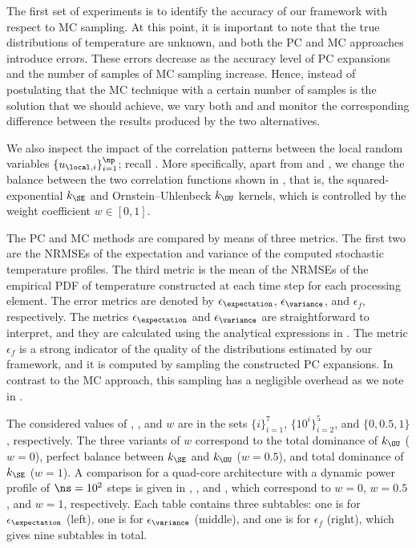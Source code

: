 
The first set of experiments is to identify the accuracy of our framework with
respect to \ac{MC} sampling. At this point, it is important to note that the
true distributions of temperature are unknown, and both the \ac{PC} and \ac{MC}
approaches introduce errors. These errors decrease as the accuracy level \lc of
\ac{PC} expansions and the number of samples \no of \ac{MC} sampling increase.
Hence, instead of postulating that the \ac{MC} technique with a certain number
of samples is the solution that we should achieve, we vary both \lc and \no and
monitor the corresponding difference between the results produced by the two
alternatives.

We also inspect the impact of the correlation patterns between the local random
variables $\{ u_{\local, i} \}_{i = 1}^\np$; recall .
More specifically, apart from \lc and \no, we change the balance between the two
correlation functions shown in , that is, the
squared-exponential $k_\SE$ and Ornstein--Uhlenbeck $k_\OU$ kernels, which is
controlled by the weight coefficient $w \in [0, 1]$.

The \ac{PC} and \ac{MC} methods are compared by means of three metrics. The
first two are the \acfp{NRMSE} of the expectation and variance of the computed
stochastic temperature profiles. The third metric is the mean of the \acp{NRMSE}
of the empirical \acf{PDF} of temperature constructed at each time step for each
processing element. The error metrics are denoted by $\epsilon_{\expectation}$,
$\epsilon_{\variance}$, and $\epsilon_f$, respectively. The metrics
$\epsilon_{\expectation}$ and $\epsilon_{\variance}$ are straightforward to
interpret, and they are calculated using the analytical expressions in
. The metric $\epsilon_f$ is a strong indicator of the
quality of the distributions estimated by our framework, and it is computed by
sampling the constructed \ac{PC} expansions. In contrast to the \ac{MC}
approach, this sampling has a negligible overhead as we note in
.

The considered values of \lc, \no, and $w$ are in the sets $\{ i \}_{i = 1}^7$,
$\{ 10^i \}_{i = 2}^5$, and $\{ 0, 0.5, 1 \}$, respectively. The three variants
of $w$ correspond to the total dominance of $k_\OU$ ($w = 0$), perfect balance
between $k_\SE$ and $k_\OU$ ($w = 0.5$), and total dominance of $k_\SE$ ($w =
1$). A comparison for a quad-core architecture with a dynamic power profile of
$\ns = 10^2$ steps is given in ,
, and , which correspond to $w
= 0$, $w = 0.5$, and $w = 1$, respectively. Each table contains three
subtables: one is for $\epsilon_{\expectation}$ (left), one is for
$\epsilon_{\variance}$ (middle), and one is for $\epsilon_f$ (right), which
gives nine subtables in total.

